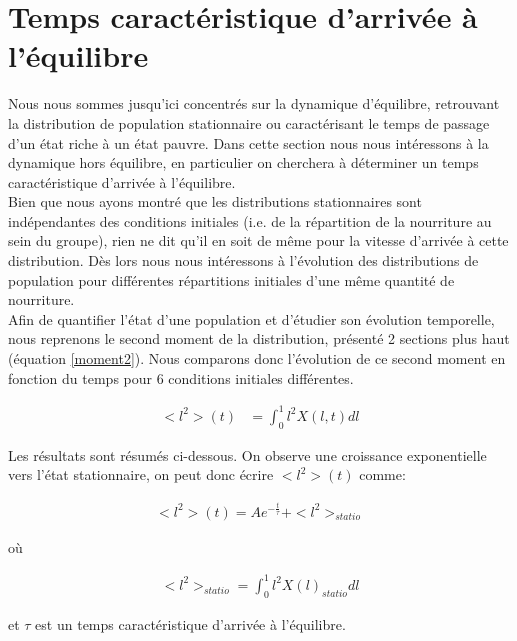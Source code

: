 \clearpage
\section{Temps caractéristique d'arrivée à l'équilibre}

Nous nous sommes jusqu'ici concentrés sur la dynamique d'équilibre, retrouvant la distribution de population stationnaire ou caractérisant le temps de passage d'un état riche à un état pauvre. Dans cette section nous nous intéressons à la dynamique hors équilibre, en particulier on cherchera à déterminer un temps caractéristique d'arrivée à l'équilibre.\\

Bien que nous ayons montré que les distributions stationnaires sont indépendantes des conditions initiales (i.e. de la répartition de la nourriture au sein du groupe), rien ne dit qu'il en soit de même pour la vitesse d'arrivée à cette distribution. Dès lors nous nous intéressons à l'évolution des distributions de population pour différentes répartitions initiales d'une même quantité de nourriture.\\

Afin de quantifier l'état d'une population et d'étudier son évolution temporelle, nous reprenons le second moment de la distribution, présenté 2 sections plus haut (équation \ref{moment2}). Nous comparons donc l'évolution de ce second moment en fonction du temps pour 6 conditions initiales différentes. 

\begin{equation}
\begin{aligned}
<l^2>(t) &= \int_0^1 l^2 X(l,t) dl 
\end{aligned}
\label{moment2}
\end{equation}


Les résultats sont résumés ci-dessous. On observe une croissance exponentielle vers l'état stationnaire, on peut donc écrire $<l^2>(t)$ comme:

\begin{equation}
\begin{aligned}
<l^2>(t)=A e^{-\frac{t}{\tau}}+<l^2>_{statio}
\end{aligned}
\end{equation}

où

\begin{equation}
\begin{aligned}
<l^2>_{statio}= \int_0^1 l^2 X(l)_{statio} dl
\end{aligned}
\end{equation}

et $\tau$ est un temps caractéristique d'arrivée à l'équilibre.